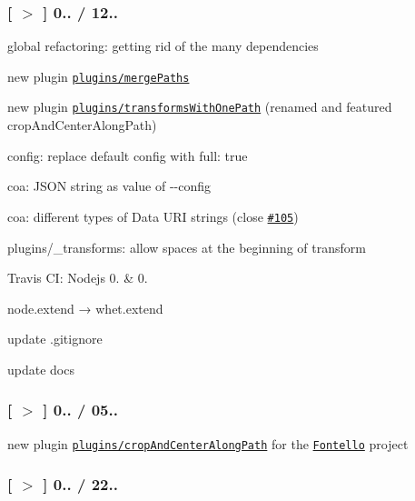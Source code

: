 \subsubsection*{\mbox{[} \href{https://github.com/svg/svgo/tree/v0.3.0}{\tt $>$} \mbox{]} 0.. / 12..}


\begin{DoxyItemize}
\item global refactoring\+: getting rid of the many dependencies
\item new plugin \href{https://github.com/svg/svgo/blob/master/plugins/mergePaths.js}{\tt plugins/merge\+Paths}
\item new plugin \href{https://github.com/svg/svgo/blob/master/plugins/transformsWithOnePath.js}{\tt plugins/transforms\+With\+One\+Path} (renamed and featured {\ttfamily crop\+And\+Center\+Along\+Path})
\item config\+: replace default config with {\ttfamily full\+: true}
\item coa\+: J\+S\+ON string as value of {\ttfamily -\/-\/config}
\item coa\+: different types of Data U\+RI strings (close \href{https://github.com/svg/svgo/issues/105}{\tt \#105})
\item plugins/\+\_\+transforms\+: allow spaces at the beginning of transform
\item Travis CI\+: Nodejs 0. \& 0.
\item {\ttfamily node.\+extend} → {\ttfamily whet.\+extend}
\item update {\ttfamily .gitignore}
\item update docs
\end{DoxyItemize}

\subsubsection*{\mbox{[} \href{https://github.com/svg/svgo/tree/v0.2.4}{\tt $>$} \mbox{]} 0.. / 05..}


\begin{DoxyItemize}
\item new plugin \href{https://github.com/svg/svgo/blob/master/plugins/cropAndCenterAlongPath.js}{\tt plugins/crop\+And\+Center\+Along\+Path} for the \href{https://github.com/fontello}{\tt Fontello} project
\end{DoxyItemize}

\subsubsection*{\mbox{[} \href{https://github.com/svg/svgo/tree/v0.2.3}{\tt $>$} \mbox{]} 0.. / 22..}


